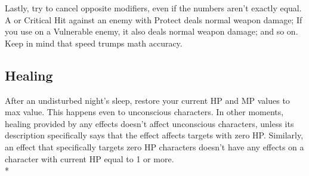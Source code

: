 \begin{multicols}{2}
\begin{boco}
Lastly, try to cancel opposite modifiers, even if the numbers aren't exactly equal. A  or Critical Hit against an enemy with Protect deals normal weapon damage; If you use  on a Vulnerable enemy, it also deals normal weapon damage; and so on. Keep in mind that speed trumps math accuracy.
\end{boco}

\subsection{Healing}\label{subsec:heal}
After an undisturbed night's sleep, restore your current HP and MP values to max value. This happens even to unconscious characters. In other moments, healing provided by any effects doesn’t affect unconscious characters, unless its description specifically says that the effect affects targets with zero HP\@. Similarly, an effect that specifically targets zero HP characters doesn’t have any effects on a character with current HP equal to 1 or more.\\*
\end{multicols}

